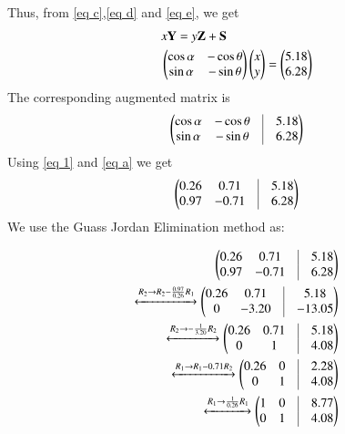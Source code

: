 \documentclass[journal,12pt,twocolumn]{IEEEtran}
\begin{document}
Thus, 
from \eqref{eq c},\eqref{eq d} and \eqref{eq e}, we get
\begin{align}
&x\mathbf{Y} = y\mathbf{Z}+\mathbf{S}\\
&\begin{pmatrix}\cos\alpha & -\cos\theta \\ \sin\alpha & -\sin\theta\end{pmatrix} \begin{pmatrix}x \\ y\end{pmatrix} = \begin{pmatrix}5.18\\6.28\end{pmatrix}
\end{align}
The corresponding augmented matrix is 
\begin{align}
		\myvec{
		\cos\alpha & -\cos\theta & \vrule & 5.18 \\
		\sin\alpha & -\sin\theta & \vrule & 6.28 \\
	}
\end{align}
Using \eqref{eq 1} and \eqref{eq a} we get
\begin{align}
		\myvec{
		0.26 & 0.71 & \vrule & 5.18 \\
		0.97 & -0.71 & \vrule & 6.28 \\
	}
\end{align}
We use the Guass Jordan Elimination method as:

\begin{align}
	\myvec{
		0.26 & 0.71 & \vrule & 5.18 \\
		0.97 & -0.71 & \vrule & 6.28 \\
	}
	\\
	\xleftrightarrow[]{R_2 \rightarrow R_2 - \frac{0.97}{0.26}R_1}
	\myvec{
		0.26 & 0.71 & \vrule & 5.18 \\
		0 & -3.20 & \vrule & -13.05 \\
	}
	\\
	\xleftrightarrow[]{R_2\rightarrow -\frac{1}{3.20}R_2}
	\myvec{
		0.26 & 0.71 & \vrule & 5.18 \\
		0 & 1 & \vrule & 4.08 \\
	}
	\\
	\xleftrightarrow[]{R_1 \rightarrow R_1 - 0.71 R_2}
	\myvec{
		0.26 & 0 & \vrule & 2.28 \\
		0 & 1 & \vrule & 4.08 \\
	}
	\\
	\xleftrightarrow[]{R_1 \rightarrow \frac{1}{0.26}R_1}
	\myvec{
		1 & 0 & \vrule & 8.77 \\
		0 & 1 & \vrule & 4.08 \\
	}
\end{align}
\end{document}
